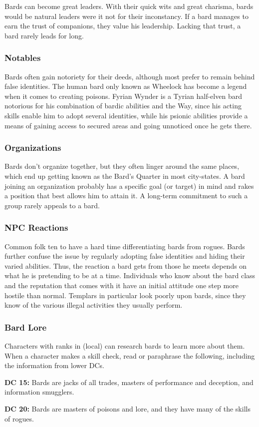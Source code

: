Bards can become great leaders. With their quick wits and great charisma, bards would be natural leaders were it not for their inconstancy. If a bard manages to earn the trust of companions, they value his leadership. Lacking that trust, a bard rarely leads for long.

\subsubsection{Notables}
Bards often gain notoriety for their deeds, although most prefer to remain behind false identities. The human bard only known as Wheelock has become a legend when it comes to creating poisons. Fyrian Wynder is a Tyrian half-elven bard notorious for his combination of bardic abilities and the Way, since his acting skills enable him to adopt several identities, while his psionic abilities provide a means of gaining access to secured areas and going unnoticed once he gets there.

\subsubsection{Organizations}
Bards don't organize together, but they often linger around the same places, which end up getting known as the Bard's Quarter in most city-states. A bard joining an organization probably has a specific goal (or target) in mind and rakes a position that best allows him to attain it. A long-term commitment to such a group rarely appeals to a bard.

\subsubsection{NPC Reactions}
Common folk ten to have a hard time differentiating bards from rogues. Bards further confuse the issue by regularly adopting false identities and hiding their varied abilities. Thus, the reaction a bard gets from those he meets depends on what he is pretending to be at a time. Individuals who know about the bard class and the reputation that comes with it have an initial attitude one step more hostile than normal. Templars in particular look poorly upon bards, since they know of the various illegal activities they usually perform.

\subsubsection{Bard Lore}
Characters with ranks in  (local) can research bards to learn more about them. When a character makes a skill check, read or paraphrase the following, including the information from lower DCs.

\textbf{DC 15:} Bards are jacks of all trades, masters of performance and deception, and information smugglers.

\textbf{DC 20:} Bards are masters of poisons and lore, and they have many of the skills of rogues.
